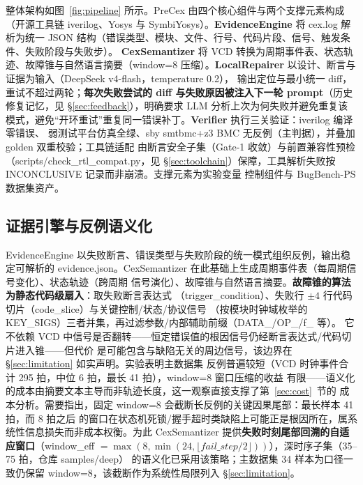 \documentclass[twocolumn,10pt]{ctexart}
\begin{document}
整体架构如图~\ref{fig:pipeline} 所示。PreCex 由四个核心组件与两个支撑元素构成（开源工具链
iverilog、Yosys\cite{yosys} 与 SymbiYosys\cite{sby}）。\textbf{EvidenceEngine} 将 cex.log
解析为统一 JSON 结构（错误类型、模块、文件、行号、代码片段、信号、触发条件、失败阶段与失败步）。
\textbf{CexSemantizer} 将 VCD 转换为周期事件表、状态轨迹、故障锥与自然语言摘要（window=8
压缩）。\textbf{LocalRepairer} 以设计、断言与证据为输入（DeepSeek v4-flash，temperature 0.2），
输出定位与最小统一 diff，重试不超过两轮；\textbf{每次失败尝试的 diff 与失败原因被注入下一轮
prompt}（历史修复记忆，见 \S\ref{sec:feedback}），明确要求 LLM 分析上次为何失败并避免重复该
模式，避免“开环重试”重复同一错误补丁。\textbf{Verifier} 执行三关验证：iverilog 编译零错误、
弱测试平台仿真全绿、sby smtbmc+z3 BMC 无反例（主判据），并叠加 golden 双重校验；工具链适配
由断言安全子集（Gate-1 收敛）与前置兼容性预检（scripts/check\_rtl\_compat.py，见
\S\ref{sec:toolchain}）保障，工具解析失败按 INCONCLUSIVE 记录而非崩溃。支撑元素为实验变量
控制组件与 BugBench-PS 数据集资产。

\subsection{证据引擎与反例语义化}\label{sec:evidence}

EvidenceEngine 以失败断言、错误类型与失败阶段的统一模式组织反例，输出稳定可解析的
evidence.json。CexSemantizer 在此基础上生成周期事件表（每周期信号变化）、状态轨迹（跨周期
信号演化）、故障锥与自然语言摘要。\textbf{故障锥的算法为静态代码级扇入}：取失败断言表达式
（trigger\_condition）、失败行 $\pm 4$ 行代码切片（code\_slice）与关键控制/状态/协议信号
（按模块时钟域枚举的 KEY\_SIGS）三者并集，再过滤参数/内部辅助前缀（DATA\_/OP\_/f\_ 等）。
它不依赖 VCD 中信号是否翻转——恒定错误值的根因信号仍经断言表达式/代码切片进入锥——但代价
是可能包含与缺陷无关的周边信号，该边界在 \S\ref{sec:limitation} 如实声明。实验表明主数据集
反例普遍较短（VCD 时钟事件合计 295 拍，中位 6 拍，最长 41 拍），window=8 窗口压缩的收益
有限——语义化的成本由摘要文本主导而非轨迹长度，这一观察直接支撑了第~\ref{sec:cost}~节的
成本分析。需要指出，固定 window=8 会截断长反例的关键因果尾部：最长样本 41 拍，而 8 拍之后
的窗口在状态机死锁/握手超时类缺陷上可能正是根因所在，属系统性信息损失而非成本权衡。为此
CexSemantizer 提供\textbf{失败时刻尾部回溯的自适应窗口}（window\_eff
$=\max(8,\min(24,\lfloor fail\_step/2\rfloor))$），深时序子集（35--75 拍，仓库 samples/deep）
的语义化已采用该策略；主数据集 34 样本为口径一致仍保留 window=8，该截断作为系统性局限列入
\S\ref{sec:limitation}。
\end{document}
